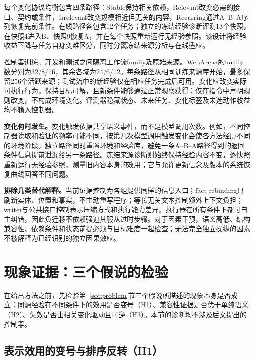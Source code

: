 \documentclass[sigconf,anonymous,review]{acmart}
\theoremstyle{zhplain}
\begin{document}
每个变化协议均衡包含四条路径：Stable保持相关依赖，Relevant改变必需的接口、契约或条件，Irrelevant改变规模相近但无关的内容，Recurring通过A--B--A序列恢复先前条件。在线路径各包含12个任务；独立的冻结经验诊断评测13个快照，在快照4进入B、快照9恢复A，并在每个快照重新运行无经验参照。该设计将经验收益下降与任务自身变难区分，同时分离冻结来源分析与在线适应。

控制器训练、开发和测试之间隔离工作流family及原始来源。WebArena的family数分别为32/8/16，其余各域为24/6/12。每条路径从相同训练来源库开始，最多保留256个活跃来源；测试流中的新经验仅在相应任务完成后可用。变化应改变实际可执行行为，保持目标可解，且新条件能够通过正常观察获得；仅在指令中声明规则改变，不构成环境变化。评测器隐藏状态、未来任务、变化标签及未选动作收益均不输入控制器。

\textbf{变化何时发生。}变化触发依据共享语义事件，而不是模型调用次数。例如，不同控制器读取和验证的频率可能不同，按第几次模型调用触发变化会使各方法经历不同的环境阶段。独立路径同时重置环境和经验库，避免一条A--B--A路径得到的返回条件信息提前泄漏给另一条路径。冻结来源诊断则始终保持经验内容不变，逐快照重新运行无经验参照，测量旧内容本身的效用；它与允许更新信念及版本的系统恢复曲线回答不同问题。

\textbf{排除几类替代解释。}当前证据控制为各组提供同样的信息入口；fact rebinding只刷新实体、位置和事实，不主动重写程序；等长无关文本控制额外上下文负担；writer与公共接口控制表示压缩方式和执行能力差异。执行器在所有条件下都可自主纠错，因此负迁移不依赖强迫其服从过时步骤。对于因素干预，语义高低、结构兼容性、依赖条件和状态前提必须与目标难度一起检查；无法完全独立操纵的因素不被解释为已经识别的独立因果效应。


\section{现象证据：三个假说的检验}
\label{sec:phenomenon}
在给出方法之前，先检验第~\ref{sec:problem}节三个假说所描述的现象本身是否成立：同源经验在不同条件下的效用是否变号（H1）、兼容性证据是否优于单纯语义（H2）、失效是否由相关变化驱动且可逆（H3）。本节的诊断均不涉及后文提出的控制器。

\subsection{表示效用的变号与排序反转（H1）}
\end{document}
